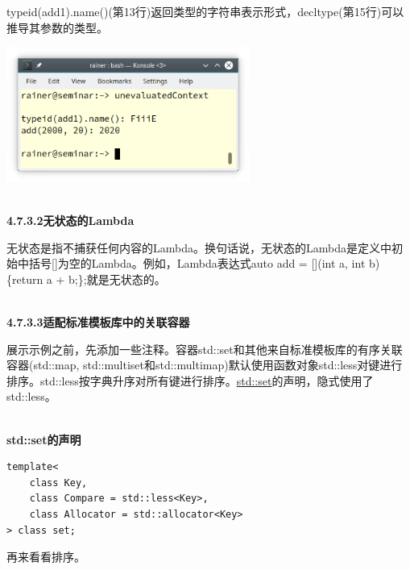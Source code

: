 typeid(add1).name()(第13行)返回类型的字符串表示形式，decltype(第15行)可以推导其参数的类型。

\begin{center}
\includegraphics[width=0.6\textwidth]{content/3/chapter4/images/43.png}\\
\end{center}

\hspace*{\fill} \\ %
\noindent
\textbf{4.7.3.2\hspace{0.2cm}无状态的Lambda}

无状态是指不捕获任何内容的Lambda。换句话说，无状态的Lambda是定义中初始中括号[]为空的Lambda。例如，Lambda表达式auto add = [](int a, int b) \{return a + b;\};就是无状态的。

\hspace*{\fill} \\ %
\noindent
\textbf{4.7.3.3\hspace{0.2cm}适配标准模板库中的关联容器}

展示示例之前，先添加一些注释。容器std::set和其他来自标准模板库的有序关联容器(std::map, std::multiset和std::multimap)默认使用函数对象std::less对键进行排序。std::less按字典升序对所有键进行排序。\href{https://en.cppreference.com/w/cpp/container/set}{std::set}的声明，隐式使用了std::less。

\hspace*{\fill} \\ %
\noindent
\textbf{std::set的声明}
\begin{lstlisting}[style=styleCXX]
template<
	class Key,
	class Compare = std::less<Key>,
	class Allocator = std::allocator<Key>
> class set;
\end{lstlisting}

再来看看排序。


